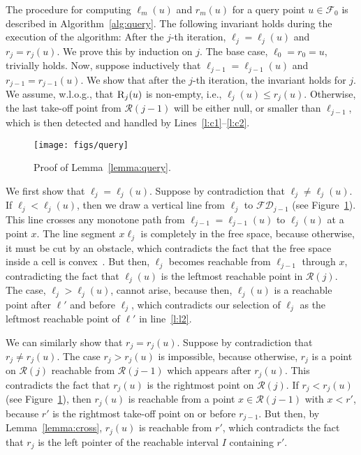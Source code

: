 \documentclass[12pt]{dalthesis}
\def\favoritefont{\bfseries \sffamily}
\def\QED{\ensuremath{{\Box}}}
\def\markatright#1{\leavevmode\unskip\nobreak\quad\hspace*{\fill}{#1}}
\newenvironment{proof}
	{\begin{trivlist}\item[\hskip\labelsep{\favoritefont Proof:}]}
	{\markatright{\QED}\end{trivlist}}
\newcommand{\qed}{}
\newcommand{\lee}{\leqslant}
\newcommand{\CF}{{\mathscr F}}
\newcommand{\CR}{{\mathscr R}}
\newcommand{\FD}{\mathscr {FD}}
\newcommand{\nil}{\mbox{null}}
\newcommand{\F}{\CF}
\newcommand{\R}{\CR}
\newcommand{\RE}{\mbox{\sc R}}
\newcommand{\lp}{\ell}
\newcommand{\rp}{r}
\begin{document}
\begin{proof}
	The procedure for computing $\lp_{m}(u)$ and $\rp_{m}(u)$
	for a query point $u \in \F_0$ is described in Algorithm~\ref{alg:query}.
	The following invariant holds during the execution of the algorithm:
	After the $j$-th iteration, $\ell_j = \lp_{j}(u)$ and $r_j = \rp_{j}(u)$.
	We prove this by induction on $j$.
	The base case, $\ell_0 = r_0 = u$, trivially holds. Now, suppose inductively that $\ell_{j-1} = \lp_{j-1}(u)$ and $r_{j-1} = \rp_{j-1}(u)$.
	We show that after the $j$-th iteration, the invariant holds for $j$.
	We assume, w.l.o.g., that $\RE_j(u)$ is non-empty, i.e., $\lp_{j}(u) \lee \rp_{j}(u)$.
	Otherwise, the last take-off point from $\R(j-1)$ will be either $\nil$, or 
	smaller than $\ell_{j-1}$, which is then detected and handled 
	by Lines~\ref{l:c1}--\ref{l:c2}.
	
	\begin{figure}[b]
		\centering
		\texttt{[image: figs/query]}
		\caption{Proof of Lemma~\ref{lemma:query}.}
		\label{fig:query}
	\end{figure}

	We first show that $\ell_j = \lp_{j}(u)$.
	Suppose by contradiction that $\ell_j \not= \lp_{j}(u)$.
	If $\ell_j < \lp_{j}(u)$, then we draw a vertical line
	from $\ell_j$ to $\FD_{j-1}$ (see Figure~\ref{fig:query}).
	This line crosses any monotone path from
	$\ell_{j-1} = \lp_{j-1}(u)$ to $\lp_j(u)$ at a point $x$.
	The line segment $x\ell_j$ is completely in the free space,
	because otherwise, it must be cut by an obstacle, which 
	contradicts the fact that the free space inside a cell is convex~\cite{AltG95}.
	But then, $\ell_j$ becomes reachable from $\ell_{j-1}$ through $x$,
	contradicting the fact that $\lp_j(u)$ is the leftmost reachable point in $\R(j)$.
	The case, $\ell_j > \lp_{j}(u)$, cannot arise, 
	because then, $\lp_j(u)$ is a reachable point after $\ell'$ and
	before $\ell_j$, which contradicts
	our selection of $\ell_j$ as the leftmost reachable point of $\ell'$ in line~\ref{l:l2}.

	We can similarly show that $r_j = \rp_{j}(u)$.
	Suppose by contradiction that $r_j \not= \rp_{j}(u)$.
	The case $r_j > \rp_{j}(u)$ is impossible,
	because otherwise, $r_j$ is a point on $\R(j)$
	reachable from $\R(j-1)$ which appears after $\rp_j(u)$.
	This contradicts the fact that $\rp_j(u)$ is the rightmost point on $\R(j)$.
	If $r_j < \rp_{j}(u)$ (see Figure~\ref{fig:query}),
	then $\rp_{j}(u)$ is reachable from a point $x \in \R(j-1)$ with $x < r'$, 
	because $r'$ is the rightmost take-off point on or before $r_{j-1}$.
	But then, by Lemma~\ref{lemma:cross}, $\rp_{j}(u)$ is reachable from $r'$,
	which contradicts the fact that $r_j$ is the left pointer of the reachable interval $I$
	containing $r'$.
	\qed
\end{proof}
\end{document}
